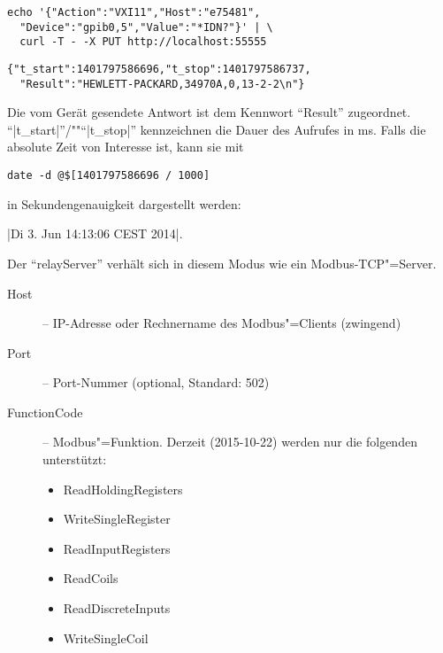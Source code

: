 \documentclass[titlepage=false,toc=nobibliography]{vl-report}
\newcommand*\theServer{relayServer}
\newcommand*\action[1]{\fbox{\nolinkurl{#1}}\medskip\par}
\begin{document}
\begin{description}
\begin{description}
\begin{description}
      \end{description}

\begin{lstlisting}[language={},name=Beispiel:]
echo '{"Action":"VXI11","Host":"e75481",
  "Device":"gpib0,5","Value":"*IDN?"}' | \
  curl -T - -X PUT http://localhost:55555
\end{lstlisting}

\begin{lstlisting}[language={},name=Rückgabe:]
{"t_start":1401797586696,"t_stop":1401797586737,
  "Result":"HEWLETT-PACKARD,34970A,0,13-2-2\n"}
\end{lstlisting}

      Die vom Gerät gesendete Antwort ist dem Kennwort "`Result"'
      zugeordnet. "`|t_start|"'/"""`|t_stop|"' kennzeichnen die
      Dauer des Aufrufes in ms. Falls die absolute Zeit
      von Interesse ist, kann sie mit
%
\begin{lstlisting}[language={}]
date -d @$[1401797586696 / 1000]
\end{lstlisting}
%
      in Sekundengenauigkeit dargestellt werden: \par
      \quad |Di 3. Jun 14:13:06 CEST 2014|.

    \item \action{MODBUS}

      Der "`\theServer"' verhält sich in diesem Modus wie ein
      Modbus-TCP"=Server.

      \begin{description}

        \item[Host] -- IP-Adresse oder Rechnername des Modbus"=Clients
        (zwingend)

        \item[Port] -- Port-Nummer (optional, Standard: 502)

        \item[FunctionCode] -- Modbus"=Funktion. Derzeit (2015-10-22) werden
        nur die folgenden unterstützt:

          \begin{itemize}

            \item ReadHoldingRegisters
            \item WriteSingleRegister
            \item ReadInputRegisters
            \item ReadCoils
            \item ReadDiscreteInputs
            \item WriteSingleCoil


\end{itemize}
\end{description}
\end{description}
\end{description}
\end{document}
